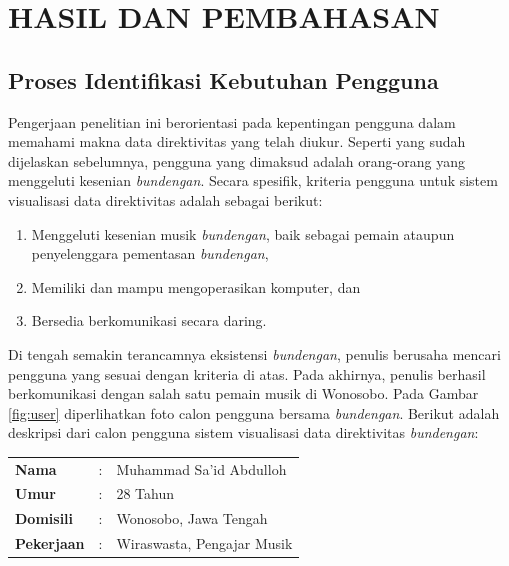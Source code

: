 \chapter{HASIL DAN PEMBAHASAN} \label{bab5}

\section{Proses Identifikasi Kebutuhan Pengguna}
Pengerjaan penelitian ini berorientasi pada kepentingan pengguna dalam memahami makna data direktivitas \bundengan yang telah diukur. Seperti yang sudah dijelaskan sebelumnya, pengguna yang dimaksud adalah orang-orang yang menggeluti kesenian \emph{bundengan}. Secara spesifik, kriteria pengguna untuk sistem visualisasi data direktivitas \bundengan adalah sebagai berikut: \par 

\begin{enumerate}
	\item Menggeluti kesenian musik \emph{bundengan}, baik sebagai pemain ataupun penyelenggara pementasan \emph{bundengan},
	\item Memiliki dan mampu mengoperasikan komputer, dan
	\item Bersedia berkomunikasi secara daring.
\end{enumerate}

Di tengah semakin terancamnya eksistensi \emph{bundengan}, penulis berusaha mencari pengguna yang sesuai dengan kriteria di atas. Pada akhirnya, penulis berhasil berkomunikasi dengan salah satu pemain musik \bundengan di Wonosobo. Pada Gambar \ref{fig:user} diperlihatkan foto calon pengguna bersama \emph{bundengan}. Berikut adalah deskripsi dari calon pengguna sistem visualisasi data direktivitas \emph{bundengan}:

\vspace{0.5 cm}

\begin{tabular}{l l l}
	\textbf{Nama} & : & Muhammad Sa’id Abdulloh \\
	\textbf{Umur} & : & 28 Tahun \\
	\textbf{Domisili} & : & Wonosobo, Jawa Tengah \\
	\textbf{Pekerjaan} & : & Wiraswasta, Pengajar Musik \\
\end{tabular}

\vspace{0.5cm}

